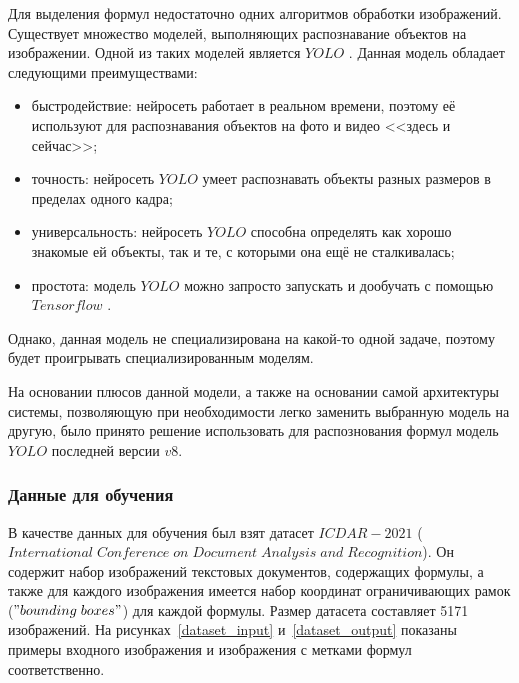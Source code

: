 Для выделения формул недостаточно одних алгоритмов обработки изображений. Существует множество моделей, выполняющих распознавание объектов на изображении.
Одной из таких моделей является $YOLO$ \cite{yolo}. Данная модель обладает следующими преимуществами:
\begin{itemize}
    \item быстродействие: нейросеть работает в реальном времени, поэтому её используют для распознавания объектов на фото и видео <<здесь и сейчас>>;
    \item точность: нейросеть $YOLO$ умеет распознавать объекты разных размеров в пределах одного кадра;
    \item универсальность: нейросеть $YOLO$ способна определять как хорошо знакомые ей объекты, так и те, с которыми она ещё не сталкивалась;
    \item простота: модель $YOLO$ можно запросто запускать и дообучать с помощью $Tensorflow$ \cite{tensorflow}.
\end{itemize}

Однако, данная модель не специализирована на какой-то одной задаче, поэтому будет проигрывать специализированным моделям.

На основании плюсов данной модели, а также на основании самой архитектуры системы, позволяющую при необходимости легко заменить выбранную модель на другую, было принято решение использовать для распознования формул модель $YOLO$ последней версии $v8$.

\subsubsection{Данные для обучения}

В качестве данных для обучения был взят датасет $ICDAR-2021$ ($International\;Conference\;on\;Document\;Analysis\;and\;Recognition$). Он содержит набор изображений текстовых документов, содержащих формулы, 
а также для каждого изображения имеется набор координат ограничивающих рамок ($"bounding\; boxes"$) для каждой формулы.
Размер датасета составляет 5171 изображений.
На рисунках~\ref{dataset_input} и~\ref{dataset_output} показаны примеры входного изображения и изображения с метками формул соответственно.

